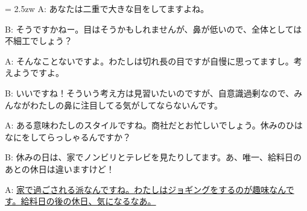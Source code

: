 \documentclass[11pt]{amsart}
\title{}
\author{}
\newenvironment{hangall}[1]{\hangindent = 2.5zw\everypar{\hangindent = 2.5zw}}{}
\begin{document}
\maketitle
\begin{hangall}{}%
A: あなたは二重で大きな目をしてますよね。

B: そうですかねー。目はそうかもしれませんが、鼻が低いので、全体としては不細工でしょう？

A: そんなことないですよ。わたしは切れ長の目ですが自慢に思ってますし。考えようですよ。

B: いいですね！そういう考え方は見習いたいのですが、自意識過剰なので、みんながわたしの鼻に注目してる気がしてならないんです。

A: ある意味わたしのスタイルですね。商社だとお忙しいでしょう。休みのひはなにをしてらっしゃるんですか？

B: 休みの日は、家でノンビリとテレビを見たりしてます。あ、唯一、給料日のあとの休日は違いますけど！

A: \ul{家で過ごされる派なんですね。わたしはジョギングをするのが趣味なんです。給料日の後の休日、気になるなあ。}\end{hangall}
\end{document}
